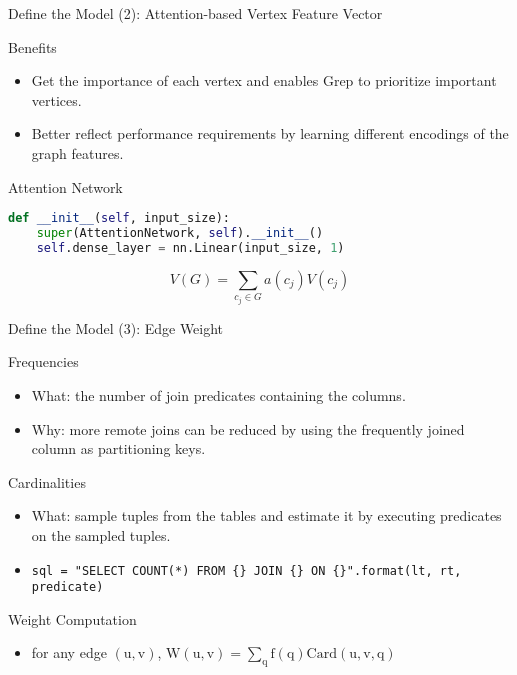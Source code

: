 \documentclass{beamer}
\begin{document}
\begin{frame}[fragile]{Define the Model (2): Attention-based Vertex Feature Vector}
    \begin{exampleblock}{Benefits}
        \begin{itemize}
            \item Get the importance of each vertex and enables Grep to prioritize important vertices.
            \item Better reflect performance requirements by learning different encodings of the graph features.
        \end{itemize}
    \end{exampleblock}
    \begin{exampleblock}{Attention Network}
        \vspace{0.25cm}
        \begin{minipage}{1.0\linewidth}
\begin{lstlisting}[language=Python]
def __init__(self, input_size):
    super(AttentionNetwork, self).__init__()
    self.dense_layer = nn.Linear(input_size, 1)
\end{lstlisting}
    \end{minipage}
        \begin{equation*}
            V(G) = \sum_{c_j\in{G}} a(c_j) V(c_j)
        \end{equation*}
    \end{exampleblock}
\end{frame}

\begin{frame}{Define the Model (3): Edge Weight}
    \begin{exampleblock}{Frequencies}
        \begin{itemize}
            \item What: the number of join predicates containing the columns.
            \item Why: more remote joins can be reduced by using the frequently joined column as partitioning keys.
        \end{itemize}
    \end{exampleblock}
    \begin{exampleblock}{Cardinalities}
        \begin{itemize}
            \item What: sample tuples from the tables and estimate it by executing predicates on the sampled tuples.
            \item \texttt{sql = "SELECT COUNT(*) FROM \{\} JOIN \{\} ON \{\}".format(lt, rt, predicate)}
        \end{itemize}
    \end{exampleblock}
    \begin{exampleblock}{Weight Computation}
        \begin{itemize}
            \item for any edge $\mathrm{(u, v)}$,
                $\mathrm{W(u, v) = \sum_{q} f(q) Card(u, v, q)}$
        \end{itemize}
    \end{exampleblock}
\end{frame}
\end{document}
